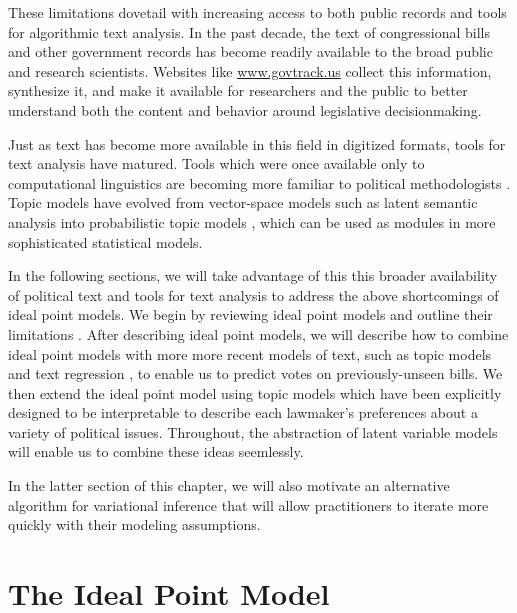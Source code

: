 These limitations dovetail with increasing access to both public
records and tools for algorithmic text analysis.  In the past decade,
the text of congressional bills and other government records has become
readily available to the broad public and research scientists.
Websites like \url{www.govtrack.us} \cite{govtrack:2009} collect this
information, synthesize it, and make it available for researchers and
the public to better understand both the content and behavior around
legislative decisionmaking.

Just as text has become more available in this field in digitized
formats, tools for text analysis have matured.  Tools which were once
available only to computational linguistics are becoming more familiar
to political methodologists \cite{zimmer:2012}.  Topic models have
evolved from vector-space models such as latent semantic analysis
\cite{deerwester:1990} into probabilistic topic models
\cite{hofmann:1999,blei:2003}, which can be used as modules in more
sophisticated statistical models.

In the following sections, we will take advantage of this this broader
availability of political text and tools for text analysis to address
the above shortcomings of ideal point models.  We begin by reviewing
ideal point models and outline their limitations
\cite{poole:1985,poole:1991,jackman:2001,martin:2002,clinton:2004}.
After describing ideal point models, we will describe how to combine
ideal point models with more more recent models of text, such as topic
models \cite{blei:2003} and text regression \cite{kogan:2009}, to
enable us to predict votes on previously-unseen bills. We then extend
the ideal point model using topic models which have been explicitly
designed to be interpretable \cite{ramage:2009} to describe each
lawmaker's preferences about a variety of political issues.
Throughout, the abstraction of latent variable models will enable us to
combine these ideas seemlessly.

In the latter section of this chapter, we will also motivate an
alternative algorithm for variational inference that will allow
practitioners to iterate more quickly with their modeling assumptions.

\section{The Ideal Point Model}
\label{sec:model}

